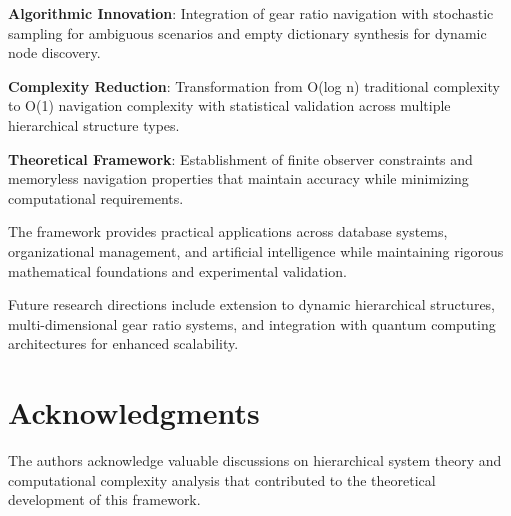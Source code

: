 \documentclass[12pt,a4paper]{article}
\begin{document}
\textbf{Algorithmic Innovation}: Integration of gear ratio navigation with stochastic sampling for ambiguous scenarios and empty dictionary synthesis for dynamic node discovery.

\textbf{Complexity Reduction}: Transformation from O(log n) traditional complexity to O(1) navigation complexity with statistical validation across multiple hierarchical structure types.

\textbf{Theoretical Framework}: Establishment of finite observer constraints and memoryless navigation properties that maintain accuracy while minimizing computational requirements.

The framework provides practical applications across database systems, organizational management, and artificial intelligence while maintaining rigorous mathematical foundations and experimental validation.

Future research directions include extension to dynamic hierarchical structures, multi-dimensional gear ratio systems, and integration with quantum computing architectures for enhanced scalability.

\section*{Acknowledgments}

The authors acknowledge valuable discussions on hierarchical system theory and computational complexity analysis that contributed to the theoretical development of this framework.
\end{document}

